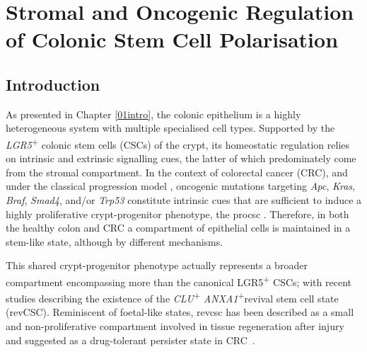 \chapter{Stromal and Oncogenic Regulation of Colonic Stem Cell Polarisation}
\label{04seq}

\newpage
\section{Introduction}


As presented in Chapter \ref{01intro}, the colonic epithelium is a highly heterogeneous system with multiple specialised cell types. Supported by the \emph{LGR5}\textsuperscript{+} colonic stem cells (CSCs) of the crypt, its homeostatic regulation relies on intrinsic and extrinsic signalling cues, the latter of which predominately come from the stromal compartment. In the context of colorectal cancer (CRC), and under the classical progression model \cite{fearon_genetic_1990}, oncogenic mutations targeting \textit{Apc}, \textit{Kras}, \textit{Braf}, \textit{Smad4}, and/or \textit{Trp53} constitute intrinsic cues that are sufficient to induce a highly proliferative crypt-progenitor phenotype, the \acrfull{procsc} \cite{van_de_wetering_-catenintcf-4_2002}.
Therefore, in both the healthy colon and CRC a compartment of epithelial cells is maintained in a stem-like state, although by different mechanisms. 

This shared crypt-progenitor phenotype actually represents a broader compartment encompassing more than the canonical LGR5\textsuperscript{+} CSCs; with recent studies describing the existence of the \emph{CLU}\textsuperscript{+} \emph{ANXA1}\textsuperscript{+}revival stem cell state (revCSC). Reminiscent of foetal-like states, \acrshort{revcsc} has been described as a small and non-proliferative compartment involved in tissue regeneration after injury~\cite{ayyaz_single-cell_2019, bues_deterministic_2022} and suggested as a drug-tolerant persister state in CRC~\cite{alvarez-varela_mex3a_2022}. 

